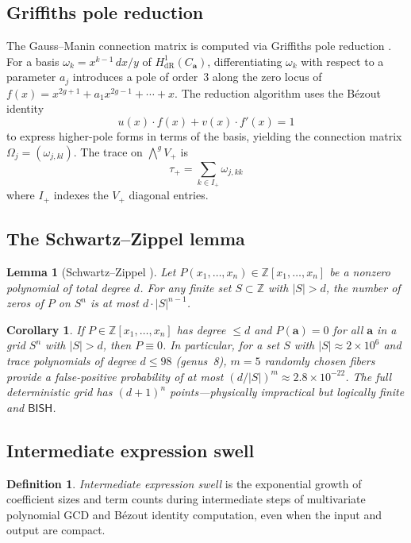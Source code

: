 \documentclass[11pt]{article}
\theoremstyle{plain}
\newtheorem{lemma}[theorem]{Lemma}
\newtheorem{corollary}[theorem]{Corollary}
\theoremstyle{definition}
\newtheorem{definition}[theorem]{Definition}
\theoremstyle{remark}
\newcommand{\ZZ}{\mathbb{Z}}
\newcommand{\BISH}{\mathsf{BISH}}
\begin{document}
\subsection{Griffiths pole reduction}

The Gauss--Manin connection matrix is computed via Griffiths pole reduction
\cite{griffiths1969,katz-oda1968}.  For a basis $\omega_k = x^{k-1}\,dx/y$
of $H^1_{\mathrm{dR}}(C_{\mathbf{a}})$, differentiating $\omega_k$ with
respect to a parameter $a_j$ introduces a pole of order~3 along the zero
locus of $f(x) = x^{2g+1} + a_1 x^{2g-1} + \cdots + x$.  The reduction
algorithm uses the B\'ezout identity
\[
  u(x) \cdot f(x) + v(x) \cdot f'(x) = 1
\]
to express higher-pole forms in terms of the basis, yielding the connection
matrix $\Omega_j = (\omega_{j,kl})$.  The trace on $\bigwedge^g V_+$ is
\[
  \tau_+ = \sum_{k \in I_+} \omega_{j,kk}
\]
where $I_+$ indexes the $V_+$ diagonal entries.

\subsection{The Schwartz--Zippel lemma}

\begin{lemma}[Schwartz--Zippel \cite{schwartz1980,zippel1979}]\label{lem:SZ}
Let $P(x_1, \ldots, x_n) \in \ZZ[x_1, \ldots, x_n]$ be a nonzero polynomial
of total degree $d$.  For any finite set $S \subset \ZZ$ with $|S| > d$,
the number of zeros of $P$ on $S^n$ is at most $d \cdot |S|^{n-1}$.
\end{lemma}

\begin{corollary}\label{cor:SZ-vanishing}
If $P \in \ZZ[x_1, \ldots, x_n]$ has degree $\leq d$ and
$P(\mathbf{a}) = 0$ for all $\mathbf{a}$ in a grid $S^n$ with
$|S| > d$, then $P \equiv 0$.  In particular, for a set $S$ with
$|S| \approx 2 \times 10^6$ and trace polynomials of degree
$d \leq 98$ (genus~8), $m = 5$ randomly chosen fibers provide
a false-positive probability of at most $(d/|S|)^m \approx 2.8 \times 10^{-22}$.
The full deterministic grid has $(d+1)^n$ points---physically impractical
but logically finite and $\BISH$.
\end{corollary}

\subsection{Intermediate expression swell}

\begin{definition}
\emph{Intermediate expression swell} is the exponential growth of
coefficient sizes and term counts during intermediate steps of
multivariate polynomial GCD and B\'ezout identity computation, even when
the input and output are compact.
\end{definition}
\end{document}
